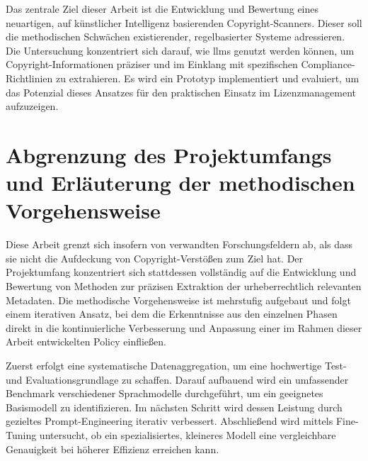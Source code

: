 Das zentrale Ziel dieser Arbeit ist die Entwicklung und Bewertung eines neuartigen, auf künstlicher Intelligenz basierenden Copyright-Scanners.
Dieser soll die methodischen Schwächen existierender, regelbasierter Systeme adressieren.
Die Untersuchung konzentriert sich darauf, wie \glspl{llm} genutzt werden können, um Copyright-Informationen präziser und im Einklang mit spezifischen Compliance-Richtlinien zu extrahieren.
Es wird ein Prototyp implementiert und evaluiert, um das Potenzial dieses Ansatzes für den praktischen Einsatz im Lizenzmanagement aufzuzeigen.


\section{Abgrenzung des Projektumfangs und Erläuterung der methodischen Vorgehensweise}\label{sec:abgrenzung}

Diese Arbeit grenzt sich insofern von verwandten Forschungsfeldern ab, als dass sie nicht die Aufdeckung von Copyright-Verstößen zum Ziel hat.
Der Projektumfang konzentriert sich stattdessen vollständig auf die Entwicklung und Bewertung von Methoden zur präzisen Extraktion der urheberrechtlich relevanten Metadaten.
Die methodische Vorgehensweise ist mehrstufig aufgebaut und folgt einem iterativen Ansatz, bei dem die Erkenntnisse aus den einzelnen Phasen direkt in die kontinuierliche Verbesserung und Anpassung einer im Rahmen dieser Arbeit entwickelten Policy einfließen.

Zuerst erfolgt eine systematische Datenaggregation, um eine hochwertige Test- und Evaluationsgrundlage zu schaffen.
Darauf aufbauend wird ein umfassender Benchmark verschiedener Sprachmodelle durchgeführt, um ein geeignetes Basismodell zu identifizieren.
Im nächsten Schritt wird dessen Leistung durch gezieltes Prompt-Engineering iterativ verbessert.
Abschließend wird mittels Fine-Tuning untersucht, ob ein spezialisiertes, kleineres Modell eine vergleichbare Genauigkeit bei höherer Effizienz erreichen kann.